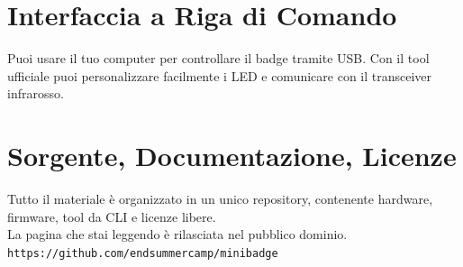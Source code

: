 \documentclass[10pt]{datasheet}
\begin{document}
\section{Interfaccia a Riga di Comando}
Puoi usare il tuo computer per controllare il badge tramite USB.
Con il tool ufficiale puoi personalizzare facilmente i LED e comunicare con il transceiver infrarosso.
\vspace*{-5pt}
\section{Sorgente, Documentazione, Licenze}
Tutto il materiale è organizzato in un unico repository, contenente hardware, firmware, tool da CLI e licenze libere.\\
La pagina che stai leggendo è rilasciata nel pubblico dominio.\\
\texttt{https://github.com/endsummercamp/minibadge}
	
\end{document}
